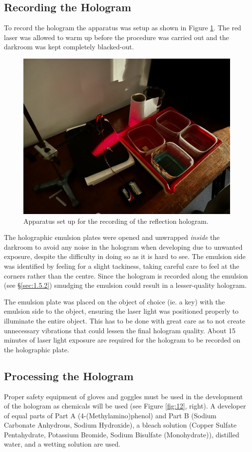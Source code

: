 \documentclass[12pt]{article}
\begin{document}
\subsection{Recording the Hologram}

To record the hologram the apparatus was setup as shown in Figure \ref{fig:11}. The red laser was allowed to warm up before the procedure was carried out and the darkroom was kept completely blacked-out.

\begin{figure}[H]
    \centering
    \includegraphics[width=.5\linewidth]{holo setup.jpeg}
    \caption{\centering Apparatus set up for the recording of the reflection hologram.}
    \label{fig:11}
\end{figure}

The holographic emulsion plates were opened and unwrapped \textit{inside} the darkroom to avoid any noise in the hologram when developing due to unwanted exposure, despite the difficulty in doing so as it is hard to see.
The emulsion side was identified by feeling for a slight tackiness, taking careful care to feel at the corners rather than the centre. Since the hologram is recorded along the emulsion (see §\ref{sec:1.5.2}) smudging the emulsion could result in a lesser-quality hologram.

The emulsion plate was placed on the object of choice (ie. a key) with the emulsion side to the object, ensuring the laser light was positioned properly to illuminate the entire object. This has to be done with great care as to not create unnecessary vibrations that could lessen the final
hologram quality. About 15 minutes of laser light exposure are required for the hologram to be recorded on the holographic plate.

\subsection{Processing the Hologram}

Proper safety equipment of gloves and goggles must be used in the development of the hologram as chemicals will be used (see Figure \ref{fig:12}, right). A developer of equal parts of Part A (4-(Methylamino)phenol) and Part B (Sodium Carbonate Anhydrous, Sodium Hydroxide), a
bleach solution (Copper Sulfate Pentahydrate, Potassium Bromide, Sodium Bisulfate (Monohydrate)), distilled water, and a wetting solution are used.
\end{document}
